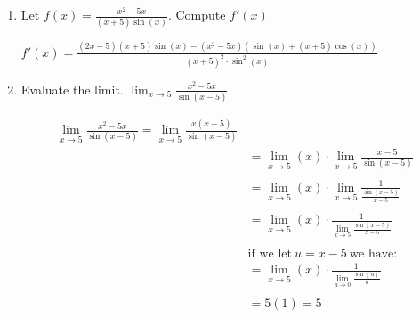 \documentclass[nooutcomes,handout]{ximera}
\begin{document}
\begin{problem} \hfil

\begin{enumerate}
	\item Let $f(x)= \frac{x^2-5x}{(x+5)\sin(x)}$.  Compute $f'(x)$

	\begin{freeResponse}	
	$f'(x)= \frac{(2x-5)(x+5)\sin(x)-(x^2-5x)(\sin(x)+(x+5)\cos(x))}{(x+5)^2 \cdot\sin^2(x)}$

	\end{freeResponse}

	\item Evaluate the limit. $\lim_{x \to 5} \frac{x^2-5x}{\sin(x-5)}$

	\begin{freeResponse}
	\begin{align*}
	\lim_{x \to 5} \frac{x^2-5x}{\sin(x-5)}=\lim_{x \to 5} \frac{x(x-5)}{\sin(x-5)}\\
	&=\lim_{x \to 5}(x) \cdot  \lim_{x \to 5}\frac{x-5}{\sin(x-5)}\\\\
	&=\lim_{x \to 5}(x) \cdot  \lim_{x \to 5}\frac{1}{\frac{\sin(x-5)}{x-5}}\\\\
	&=\lim_{x \to 5}(x) \cdot \frac{1}{ \lim_{x \to 5}\frac{\sin(x-5)}{x-5}}\\\\
	& \text{if we let}\ u=x-5\ \text{we have:}\\
	&=\lim_{x \to 5}(x) \cdot  \frac{1}{\lim_{u \to 0}\frac{\sin(u)}{u}}\\\\
	&= 5(1)=5
	\end{align*}
	\end{freeResponse}

\end{enumerate}
\end{problem}		
		
\end{document}

